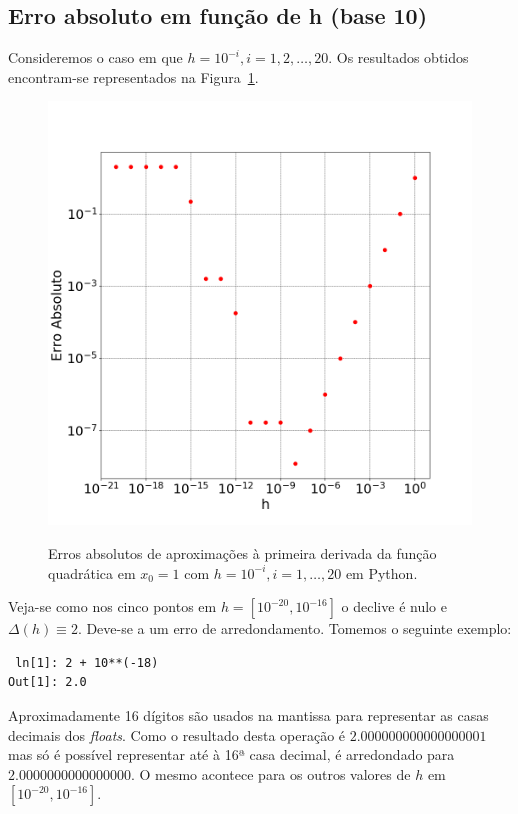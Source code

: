 \documentclass[aps,pre,twocolumn,showpacs,amsmath,amssymb]{revtex4-1}
\begin{document}
\subsection{Erro absoluto em função de h (base 10)}
Consideremos o caso em que $h=10^{-i}, i=1,2,\ldots,20$. Os resultados obtidos encontram-se representados na
Figura~\ref{figure2.1}.\\
\begin{figure}[ht]
	\center
    \includegraphics[width=\columnwidth]{erroh10.png} \\
	\caption{Erros absolutos de aproximações à primeira derivada da função quadrática em $x_0=1$ com $h=10^{-i}, i=1,\ldots,20$ em Python.}
  \label{figure2.1}
\end{figure}
Veja-se como nos cinco pontos em $h=[10^{-20},10^{-16}]$ o declive é nulo e $\Delta(h)\equiv2$. Deve-se a um erro de arredondamento. Tomemos o seguinte exemplo:
\begin{lstlisting}
 ln[1]: 2 + 10**(-18)
Out[1]:	2.0
\end{lstlisting}
Aproximadamente 16 dígitos são usados na mantissa para representar as casas decimais dos \textit{floats}. Como o resultado desta operação é $2.000000000000000001$ mas só é possível representar até à 16ª casa decimal, é arredondado para $2.0000000000000000$. O mesmo acontece para os outros valores de $h$ em $[10^{-20},10^{-16}]$.
\end{document}
